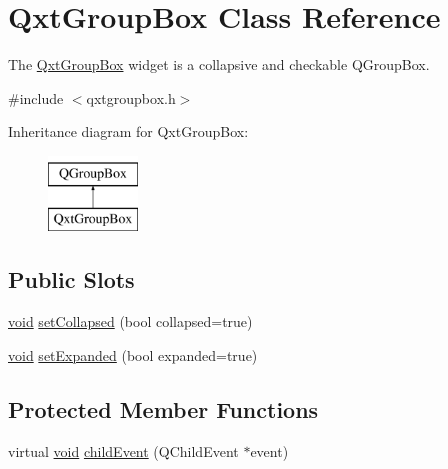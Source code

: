 \hypertarget{class_qxt_group_box}{\section{Qxt\-Group\-Box Class Reference}
\label{class_qxt_group_box}
}


The \hyperlink{class_qxt_group_box}{Qxt\-Group\-Box} widget is a collapsive and checkable Q\-Group\-Box.  




{\ttfamily \#include $<$qxtgroupbox.\-h$>$}

Inheritance diagram for Qxt\-Group\-Box\-:\begin{figure}[H]
\begin{center}
\leavevmode
\includegraphics[height=2.000000cm]{class_qxt_group_box}
\end{center}
\end{figure}
\subsection*{Public Slots}
\begin{DoxyCompactItemize}
\item 
\hyperlink{group___u_a_v_objects_plugin_ga444cf2ff3f0ecbe028adce838d373f5c}{void} \hyperlink{class_qxt_group_box_aba496a650834bd948eab93cb7a2fad1d}{set\-Collapsed} (bool collapsed=true)
\item 
\hyperlink{group___u_a_v_objects_plugin_ga444cf2ff3f0ecbe028adce838d373f5c}{void} \hyperlink{class_qxt_group_box_a722b3ebd3b3bcadc8f5054c47b0d2fe1}{set\-Expanded} (bool expanded=true)
\end{DoxyCompactItemize}
\subsection*{Protected Member Functions}
\begin{DoxyCompactItemize}
\item 
virtual \hyperlink{group___u_a_v_objects_plugin_ga444cf2ff3f0ecbe028adce838d373f5c}{void} \hyperlink{class_qxt_group_box_a5cf2774fc7dd9c36d46e6d30ef07fa1b}{child\-Event} (Q\-Child\-Event $\ast$event)
\end{DoxyCompactItemize}


